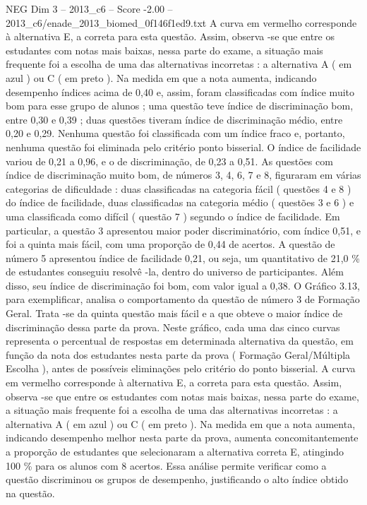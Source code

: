 \begin{textsample}{NEG Dim 3 – 2013\_c6 – Score -2.00 – 2013\_c6/enade\_2013\_biomed\_0f146f1ed9.txt}
A curva em vermelho corresponde à alternativa E, a correta para esta questão.
Assim, observa -se que entre os estudantes com notas mais baixas, nessa parte do exame, a situação mais frequente foi a escolha de uma das alternativas incorretas : a alternativa A ( em azul ) ou C ( em preto ).
Na medida em que a nota aumenta, indicando desempenho índices acima de 0,40 e, assim, foram classificadas com índice muito bom para esse grupo de alunos ; uma questão teve índice de discriminação bom, entre 0,30 e 0,39 ; duas questões tiveram índice de discriminação médio, entre 0,20 e 0,29.
Nenhuma questão foi classificada com um índice fraco e, portanto, nenhuma questão foi eliminada pelo critério ponto bisserial.
O índice de facilidade variou de 0,21 a 0,96, e o de discriminação, de 0,23 a 0,51.
As questões com índice de discriminação muito bom, de números 3, 4, 6, 7 e 8, figuraram em várias categorias de dificuldade : duas classificadas na categoria fácil ( questões 4 e 8 ) do índice de facilidade, duas classificadas na categoria médio ( questões 3 e 6 ) e uma classificada como difícil ( questão 7 ) segundo o índice de facilidade.
Em particular, a questão 3 apresentou maior poder discriminatório, com índice 0,51, e foi a quinta mais fácil, com uma proporção de 0,44 de acertos.
A questão de número 5 apresentou índice de facilidade 0,21, ou seja, um quantitativo de 21,0 \% de estudantes conseguiu resolvê -la, dentro do universo de participantes.
Além disso, seu índice de discriminação foi bom, com valor igual a 0,38.
O Gráfico 3.13, para exemplificar, analisa o comportamento da questão de número 3 de Formação Geral.
Trata -se da quinta questão mais fácil e a que obteve o maior índice de discriminação dessa parte da prova.
Neste gráfico, cada uma das cinco curvas representa o percentual de respostas em determinada alternativa da questão, em função da nota dos estudantes nesta parte da prova ( Formação Geral/Múltipla Escolha ), antes de possíveis eliminações pelo critério do ponto bisserial.
A curva em vermelho corresponde à alternativa E, a correta para esta questão.
Assim, observa -se que entre os estudantes com notas mais baixas, nessa parte do exame, a situação mais frequente foi a escolha de uma das alternativas incorretas : a alternativa A ( em azul ) ou C ( em preto ).
Na medida em que a nota aumenta, indicando desempenho melhor nesta parte da prova, aumenta concomitantemente a proporção de estudantes que selecionaram a alternativa correta E, atingindo 100 \% para os alunos com 8 acertos.
Essa análise permite verificar como a questão discriminou os grupos de desempenho, justificando o alto índice obtido na questão.

\end{textsample}

